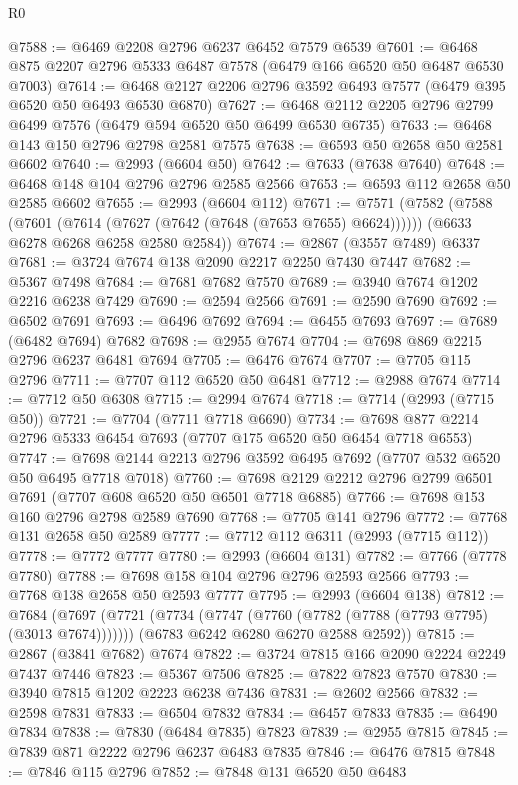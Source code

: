\begin{lexlean}{R0}
\begin{coremodule}
@7588 := @6469 @2208 @2796 @6237 @6452 @7579 @6539
@7601 := @6468 @875 @2207 @2796 @5333 @6487 @7578 (@6479 @166 @6520 @50 @6487 @6530 @7003)
@7614 := @6468 @2127 @2206 @2796 @3592 @6493 @7577 (@6479 @395 @6520 @50 @6493 @6530 @6870)
@7627 := @6468 @2112 @2205 @2796 @2799 @6499 @7576 (@6479 @594 @6520 @50 @6499 @6530 @6735)
@7633 := @6468 @143 @150 @2796 @2798 @2581 @7575
@7638 := @6593 @50 @2658 @50 @2581 @6602
@7640 := @2993 (@6604 @50)
@7642 := @7633 (@7638 @7640)
@7648 := @6468 @148 @104 @2796 @2796 @2585 @2566
@7653 := @6593 @112 @2658 @50 @2585 @6602
@7655 := @2993 (@6604 @112)
@7671 := @7571
    (@7582
      (@7588 (@7601 (@7614 (@7627 (@7642 (@7648 (@7653 @7655) @6624))))))
      (@6633 @6278 @6268 @6258 @2580 @2584))
@7674 := @2867 (@3557 @7489) @6337
@7681 := @3724 @7674 @138 @2090 @2217 @2250 @7430 @7447
@7682 := @5367 @7498
@7684 := @7681 @7682 @7570
@7689 := @3940 @7674 @1202 @2216 @6238 @7429
@7690 := @2594 @2566
@7691 := @2590 @7690
@7692 := @6502 @7691
@7693 := @6496 @7692
@7694 := @6455 @7693
@7697 := @7689 (@6482 @7694) @7682
@7698 := @2955 @7674
@7704 := @7698 @869 @2215 @2796 @6237 @6481 @7694
@7705 := @6476 @7674
@7707 := @7705 @115 @2796
@7711 := @7707 @112 @6520 @50 @6481
@7712 := @2988 @7674
@7714 := @7712 @50 @6308
@7715 := @2994 @7674
@7718 := @7714 (@2993 (@7715 @50))
@7721 := @7704 (@7711 @7718 @6690)
@7734 := @7698 @877 @2214 @2796 @5333 @6454 @7693 (@7707 @175 @6520 @50 @6454 @7718 @6553)
@7747 := @7698 @2144 @2213 @2796 @3592 @6495 @7692 (@7707 @532 @6520 @50 @6495 @7718 @7018)
@7760 := @7698 @2129 @2212 @2796 @2799 @6501 @7691 (@7707 @608 @6520 @50 @6501 @7718 @6885)
@7766 := @7698 @153 @160 @2796 @2798 @2589 @7690
@7768 := @7705 @141 @2796
@7772 := @7768 @131 @2658 @50 @2589
@7777 := @7712 @112 @6311 (@2993 (@7715 @112))
@7778 := @7772 @7777
@7780 := @2993 (@6604 @131)
@7782 := @7766 (@7778 @7780)
@7788 := @7698 @158 @104 @2796 @2796 @2593 @2566
@7793 := @7768 @138 @2658 @50 @2593 @7777
@7795 := @2993 (@6604 @138)
@7812 := @7684
    (@7697
      (@7721 (@7734 (@7747 (@7760 (@7782 (@7788 (@7793 @7795) (@3013 @7674)))))))
      (@6783 @6242 @6280 @6270 @2588 @2592))
@7815 := @2867 (@3841 @7682) @7674
@7822 := @3724 @7815 @166 @2090 @2224 @2249 @7437 @7446
@7823 := @5367 @7506
@7825 := @7822 @7823 @7570
@7830 := @3940 @7815 @1202 @2223 @6238 @7436
@7831 := @2602 @2566
@7832 := @2598 @7831
@7833 := @6504 @7832
@7834 := @6457 @7833
@7835 := @6490 @7834
@7838 := @7830 (@6484 @7835) @7823
@7839 := @2955 @7815
@7845 := @7839 @871 @2222 @2796 @6237 @6483 @7835
@7846 := @6476 @7815
@7848 := @7846 @115 @2796
@7852 := @7848 @131 @6520 @50 @6483

\end{coremodule}
\end{lexlean}
